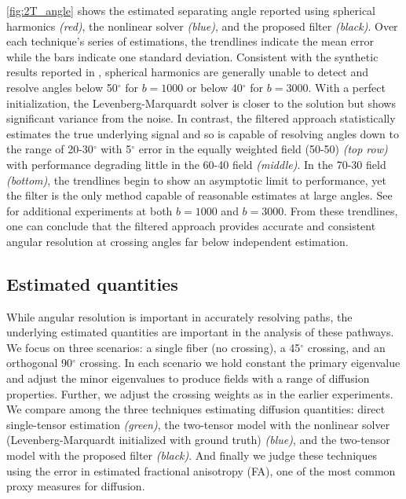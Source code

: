 \documentclass[final,hyperref]{gatech-thesis}
\newcommand{\citet}[1]{\cite{#1}} %
\renewcommand{\deg}{\ensuremath{^\circ}\xspace}
\newcommand{\bn}[1]{\ensuremath{b\!=\!#1}\xspace}
\newcommand{\bone}{\bn{1000}}
\newcommand{\bthree}{\bn{3000}}
\begin{document}
\autoref{fig:2T_angle} shows the estimated separating angle reported using
spherical harmonics \textit{(red)}, the nonlinear solver \textit{(blue)}, and
the proposed filter \textit{(black)}.  Over each technique's series of
estimations, the trendlines indicate the mean error while the bars indicate
one standard deviation.
%
Consistent with the synthetic results reported in
\cite{Descoteaux2009tmi,Descoteaux2007mrm}, spherical harmonics are generally
unable to detect and resolve angles below 50\deg for \bone or below 40\deg for
\bthree.  With a perfect initialization, the Levenberg-Marquardt solver is
closer to the solution but shows significant variance from the noise.  In
contrast, the filtered approach statistically estimates the true underlying
signal and so is capable of resolving angles down to the range of 20-30\deg
with 5\deg error in the equally weighted field (50-50) \textit{(top row)} with
performance degrading little in the 60-40 field \textit{(middle)}.  In the
70-30 field \textit{(bottom)}, the trendlines begin to show an asymptotic
limit to performance, yet the filter is the only method capable of reasonable
estimates at large angles.  See \citet{malcolm2009ipmi} for additional
experiments at both \bone and \bthree.  From these trendlines, one can
conclude that the filtered approach provides accurate and consistent angular
resolution at crossing angles far below independent estimation.




\subsection{Estimated quantities} \label{sec:quantities}

While angular resolution is important in accurately resolving paths, the
underlying estimated quantities are important in the analysis of these
pathways.
%
We focus on three scenarios: a single fiber (no crossing), a 45\deg crossing,
and an orthogonal 90\deg crossing.  In each scenario we hold constant the
primary eigenvalue and adjust the minor eigenvalues to produce fields with a
range of diffusion properties.  Further, we adjust the crossing weights as in
the earlier experiments.
%
We compare among the three techniques estimating diffusion quantities: direct
single-tensor estimation \textit{(green)}, the two-tensor model with the
nonlinear solver (Levenberg-Marquardt initialized with ground truth)
\textit{(blue)}, and the two-tensor model with the proposed filter
\textit{(black)}.
%
And finally we judge these techniques using the error in estimated fractional
anisotropy (FA), one of the most common proxy measures for diffusion.
\end{document}
